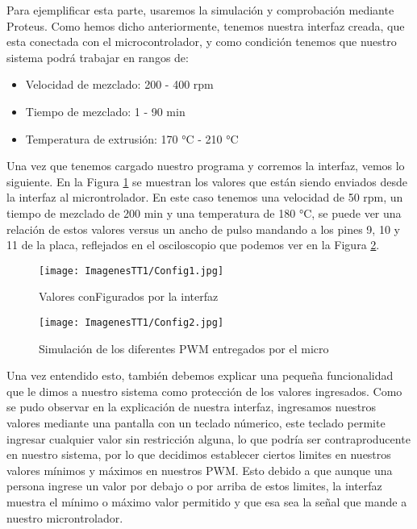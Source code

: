 \documentclass[14pt,oneside]{extarticle} %
\begin{document}
Para ejemplificar esta parte, usaremos la simulación y comprobación mediante Proteus. Como hemos dicho anteriormente, tenemos nuestra interfaz creada, que esta conectada con el microcontrolador, y como condición tenemos que nuestro sistema podrá trabajar en rangos de:

\begin{itemize}
    \item Velocidad de mezclado: 200 - 400 rpm
    \item Tiempo de mezclado: 1 - 90 min
    \item Temperatura de extrusión: 170 °C - 210 °C
\end{itemize}

Una vez que tenemos cargado nuestro programa y corremos la interfaz, vemos lo siguiente. En la Figura \ref{fig:Config1} se muestran los valores que están siendo enviados desde la interfaz al microntrolador. En este caso tenemos una velocidad de 50 rpm, un tiempo de mezclado de 200 min y una temperatura de 180 °C, se puede ver una relación de estos valores versus un ancho de pulso mandando a los pines 9, 10 y 11 de la placa, reflejados en el osciloscopio que podemos ver en la Figura \ref{fig:Config2}.

\begin{figure}[H]
    \centering
    \texttt{[image: ImagenesTT1/Config1.jpg]}
    \caption{Valores conFigurados por la interfaz}
    \label{fig:Config1}
\end{figure}

\begin{figure}[H]
    \centering
    \texttt{[image: ImagenesTT1/Config2.jpg]}
    \caption{Simulación de los diferentes PWM entregados por el micro}
    \label{fig:Config2}
\end{figure}

Una vez entendido esto, también debemos explicar una pequeña funcionalidad que le dimos a nuestro sistema como protección de los valores ingresados. Como se pudo observar en la explicación de nuestra interfaz, ingresamos nuestros valores mediante una pantalla con un teclado númerico, este teclado permite ingresar cualquier valor sin restricción alguna, lo que podría ser contraproducente en nuestro sistema, por lo que decidimos establecer ciertos limites en nuestros valores mínimos y máximos en nuestros PWM. Esto debido a que aunque una persona ingrese un valor por debajo o por arriba de estos limites, la interfaz muestra el mínimo o máximo valor permitido y que esa sea la señal que mande a nuestro microntrolador. 
\end{document}
